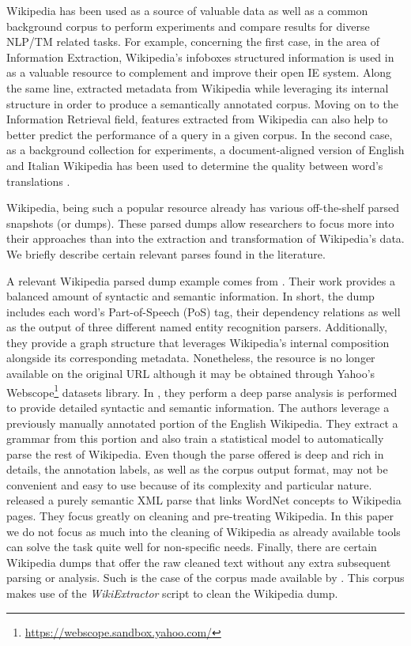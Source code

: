 Wikipedia has been used as a source of valuable data as well as a common background corpus to perform experiments and compare results for diverse NLP/TM related tasks. For example, concerning the first case, in the area of Information Extraction, Wikipedia's infoboxes structured information is used in \cite{Wu2010} as a valuable resource to complement and improve their open IE system. Along the same line, \cite{charton2010}  extracted metadata from Wikipedia while leveraging its internal structure in order to produce a semantically annotated corpus. Moving on to the Information Retrieval field, features extracted from Wikipedia can also help to better predict the performance of a query  \cite{katz2014} in a given  corpus.  In the second case, as a background collection for experiments, a document-aligned version of English and Italian Wikipedia has been used to determine the quality between word's translations \cite{vulic2011}.  

Wikipedia, being such a popular resource  already has various off-the-shelf parsed snapshots (or dumps). These parsed dumps allow researchers to focus more into their approaches than into the extraction and transformation of Wikipedia's data.  We briefly describe certain relevant parses found in the literature.   
%



A relevant Wikipedia parsed dump example comes from \cite{ATSERIAS08}. Their work provides a balanced amount of syntactic and semantic information. In short, the dump includes each word's Part-of-Speech (PoS) tag, their dependency relations as well as the output of three different named entity recognition parsers. Additionally, they provide a graph structure that leverages Wikipedia's internal composition alongside its corresponding metadata. Nonetheless, the resource is no longer available on the original URL although it may be obtained through Yahoo's Webscope\footnote{\url{https://webscope.sandbox.yahoo.com/}} datasets library.  In \cite{FLICKINGER10}, they perform a deep parse analysis is performed to provide detailed syntactic and semantic information. The authors leverage a previously manually annotated portion of the English Wikipedia. They extract a grammar from this portion and also train a statistical model  to automatically parse the rest of Wikipedia. Even though the parse offered is deep and rich in details, the annotation labels, as well as the corpus output format, may not be convenient and easy to use because of its complexity and particular nature. \cite{SchenkelSK07}  released a purely semantic XML parse that links WordNet concepts to Wikipedia pages. They focus greatly on cleaning and pre-treating Wikipedia. In this paper we do not focus as much into the cleaning of Wikipedia as already available tools can solve the task quite well for non-specific needs. 
Finally, there are certain Wikipedia dumps that offer the raw cleaned text without any extra subsequent parsing or analysis. Such is the case of the corpus made available by \cite{westbury2010}. This corpus makes  use of the \textit{WikiExtractor} script  \cite{Attardi2015} to clean the Wikipedia dump.
  
